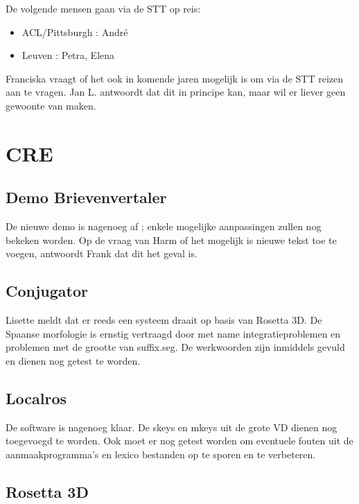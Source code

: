 \noindent De volgende mensen gaan via de STT op reis:
\begin{itemize}
   \item ACL/Pittsburgh : Andr\'{e}
   \item Leuven         : Petra, Elena
\end{itemize}

\noindent Franciska vraagt of het ook in komende jaren mogelijk is om via de 
STT reizen aan te vragen. Jan L. antwoordt dat dit in principe kan, maar wil 
er liever geen gewoonte van maken.

\section {CRE}

\subsection {Demo Brievenvertaler}

De nieuwe demo is nagenoeg af ; enkele mogelijke aanpassingen zullen nog 
bekeken worden. Op de vraag van Harm of het mogelijk is nieuwe 
tekst toe te voegen, antwoordt Frank dat dit het geval is.

\subsection {Conjugator}

Lisette meldt dat er reeds een systeem draait op basis van Rosetta 3D. De 
Spaanse morfologie is ernstig vertraagd door met name integratieproblemen 
en problemen met de grootte van suffix.seg. De werkwoorden zijn inmiddels 
gevuld en dienen nog getest te worden.

\subsection {Localros} 
De software is nagenoeg klaar. De skeys en mkeys uit de grote VD dienen 
nog toegevoegd te worden. Ook moet er nog getest worden om eventuele 
fouten uit de aanmaakprogramma's en lexico bestanden op te sporen en te 
verbeteren.

\subsection {Rosetta 3D} 

